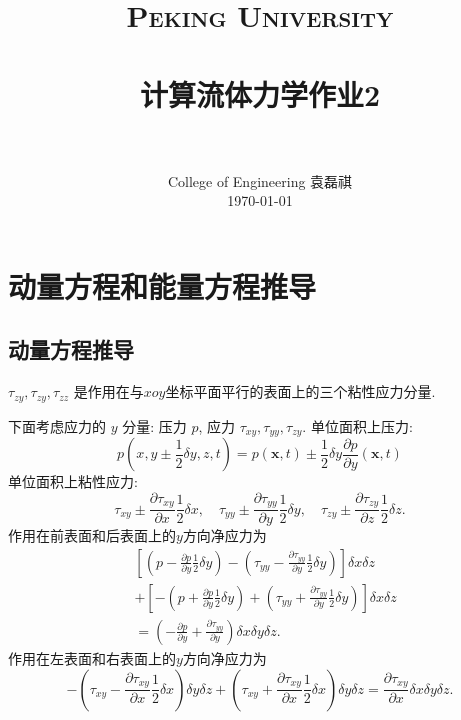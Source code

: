 \documentclass[12pt]{article}
\title{
		\vspace{-1in} 	
		\usefont{OT1}{bch}{b}{n}
		\normalfont \normalsize \textsc{\LARGE Peking University}\\[0.2cm] %
		\horrule{0.5pt} \\[0.2cm]
		\huge \bfseries{计算流体力学作业2} \\[-0.2cm]
		\horrule{2pt} \\[0.2cm]
}
\author{
		\normalfont 								\normalsize
		College of Engineering \quad 2001111690  \quad 袁磊祺\\	\normalsize
        \today
}
\date{}
\begin{document}


\maketitle

\section{动量方程和能量方程推导}

\subsection{动量方程推导}

$\tau_{z y}, \tau_{z y}, \tau_{z z}$ 是作用在与$xoy$坐标平面平行的表面上的三个粘性应力分量. 

下面考虑应力的 $y$ 分量: 压力 $p$, 应力 $\tau_{x y}, \tau_{y y}, \tau_{z y} .$  单位面积上压力:
\begin{equation}
	p\left(x , y\pm \frac{1}{2} \delta y, z, t\right)=p(\bm{x}, t) \pm \frac{1}{2} \delta y \frac{\partial p}{\partial y}(\bm{x}, t)
\end{equation}
单位面积上粘性应力:
\begin{equation}
	\tau_{x y} \pm \frac{\partial \tau_{x y}}{\partial x} \frac{1}{2} \delta x, \quad \tau_{y y} \pm \frac{\partial \tau_{y y}}{\partial y} \frac{1}{2} \delta y, \quad \tau_{z y} \pm \frac{\partial \tau_{z y}}{\partial z} \frac{1}{2} \delta z.
\end{equation}
作用在前表面和后表面上的$y$方向净应力为
\begin{align}
&{\left[\left(p-\frac{\partial p}{\partial y} \frac{1}{2} \delta y\right)-\left(\tau_{yy}-\frac{\partial \tau_{yy}}{\partial y} \frac{1}{2} \delta y\right)\right] \delta x \delta z} \\
&+\left[-\left(p+\frac{\partial p}{\partial y} \frac{1}{2} \delta y\right)+\left(\tau_{y y}+\frac{\partial \tau_{y y}}{\partial y} \frac{1}{2} \delta y\right)\right] \delta x \delta z \\
&=\left(-\frac{\partial p}{\partial y}+\frac{\partial \tau_{y y}}{\partial y}\right) \delta x \delta y \delta z.
\end{align}
作用在左表面和右表面上的$y$方向净应力为
\begin{equation}
	-\left(\tau_{xy}-\frac{\partial \tau_{xy}}{\partial x} \frac{1}{2} \delta x\right) \delta y \delta z+\left(\tau_{xy}+\frac{\partial \tau_{xy}}{\partial x} \frac{1}{2} \delta x\right) \delta y \delta z=\frac{\partial \tau_{xy}}{\partial x} \delta x \delta y \delta z.
\end{equation}
\end{document}
